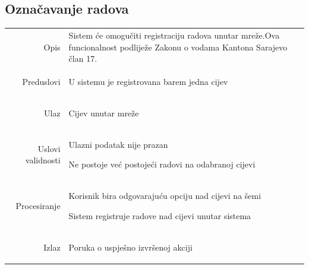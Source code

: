 \documentclass[]{report}
\begin{document}


\subsection{Označavanje radova}


\begin{tabular}{rp{}}
Opis & 
\hspace{12pt} Sistem će omogučiti registraciju radova unutar mreže.Ova funcionalnost podliježe Zakonu o vodama Kantona Sarajevo član 17.

\\
Preduslovi & 
\begin{compactitem}
    \item U sistemu je registrovana barem jedna cijev
\end{compactitem}

\\
Ulaz & 

\begin{compactitem} 
    \item Cijev unutar mreže
\end{compactitem}

\\
Uslovi validnosti &

\begin{compactitem} 
    \item Ulazni podatak nije prazan
    \item Ne postoje već postojeći radovi na odabranoj cijevi
\end{compactitem}

\\
Procesiranje &

\begin{compactitem} 
    \item Korisnik bira odgovarajuću opciju nad cijevi na šemi
    \item Sistem registruje radove nad cijevi unutar sistema
\end{compactitem}

\\
Izlaz &

\begin{compactitem} 
    \item Poruka o uspješno izvršenoj akciji
\end{compactitem}


\end{tabular}
\end{document}
